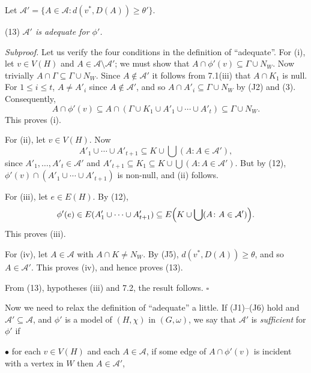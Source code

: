 Let $\mathcal{A}' = \{A \in \mathcal{A} \colon d(v^*, D(A)) \ge \theta'\}$.

\hspace*{12pt}(13) \textit{$\mathcal{A}'$ is adequate for $\phi'$.}

\textit{Subproof.} Let us verify the four conditions in the definition of ``adequate''. For (i), let $v \in V(H)$ and $A \in \mathcal{A} \setminus \mathcal{A}'$; we must show that $A \cap \phi'(v) \subseteq \Gamma \cup N_W$. Now trivially $A \cap \Gamma \subseteq \Gamma \cup N_W$. Since $A \notin \mathcal{A}'$ it follows from 7.1(iii) that $A \cap K_1$ is null. For $1 \le i \le t$, $A \ne A'_i$ since $A \notin \mathcal{A}'$, and so $A \cap A'_i \subseteq \Gamma \cup N_W$ by (J2) and (3). Consequently,
\begin{equation*}
A \cap \phi'(v) \subseteq A \cap (\Gamma \cup K_1 \cup A'_1 \cup \cdots \cup A'_t) \subseteq \Gamma \cup N_W.
\end{equation*}
This proves (i).

For (ii), let $v \in V(H)$. Now
\begin{equation*}
A'_1 \cup \cdots \cup A'_{t+1} \subseteq K \cup \bigcup(A \colon A \in \mathcal{A}'),
\end{equation*}
since $A'_1, \ldots, A'_t \in \mathcal{A}'$ and $A'_{t+1} \subseteq K_1 \subseteq K \cup \bigcup(A \colon A \in \mathcal{A}')$. But by (12), $\phi'(v) \cap (A'_1 \cup \cdots \cup A'_{t+1})$ is non-null, and (ii) follows.

For (iii), let $e \in E(H)$. By (12),
\begin{equation*}
\phi'(e) \in E(A'_1 \cup \cdots \cup A'_{t+1}) \subseteq E\Bigl(K \cup \bigcup(A \colon A \in \mathcal{A}')\Bigr).
\end{equation*}
This proves (iii).

For (iv), let $A \in \mathcal{A}$ with $A \cap K \ne N_W$. By (J5), $d(v^*, D(A)) \ge \theta$, and so $A \in \mathcal{A}'$. This proves (iv), and hence proves (13).

From (13), hypotheses (iii) and 7.2, the result follows. $\square$

Now we need to relax the definition of ``adequate'' a little. If (J1)--(J6) hold and $\mathcal{A}' \subseteq \mathcal{A}$, and $\phi'$ is a model of $(H, \chi)$ in $(G, \omega)$, we say that $\mathcal{A}'$ is \textit{sufficient} for $\phi'$ if

\hspace*{12pt}$\bullet$ for each $v \in V(H)$ and each $A \in \mathcal{A}$, if some edge of $A \cap \phi'(v)$ is incident with a vertex in $W$ then $A \in \mathcal{A}'$,

